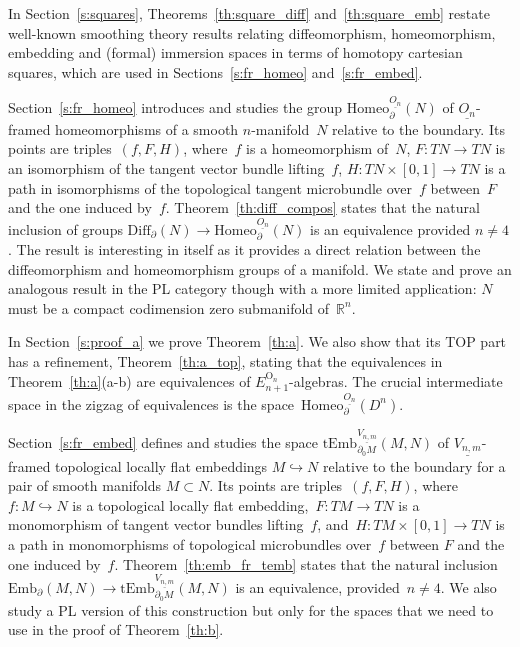 \documentclass[11pt]{amsart}
\theoremstyle{definition}
\newcommand{\R}{{\mathbb R}}
\newcommand{\Emb}{\mathrm{Emb}}
\newcommand{\tEmb}{\mathrm{tEmb}}
\newcommand{\Diff}{\mathrm{Diff}}
\newcommand{\Homeo}{\mathrm{Homeo}}
\newcommand{\OO}{\mathrm{O}}
\numberwithin{equation}{section}
\begin{document}
In Section~\ref{s:squares}, Theorems~\ref{th:square_diff} and~\ref{th:square_emb} restate well-known smoothing theory results relating diffeomorphism, homeomorphism, embedding and (formal) immersion spaces in terms of homotopy cartesian squares, which are used  in Sections~\ref{s:fr_homeo} and~\ref{s:fr_embed}. 

Section~\ref{s:fr_homeo} introduces and studies the group $\Homeo_\partial^{\underline{O_n}}(N)$ of $\underline{O_n}$-framed homeomorphisms of a smooth $n$-manifold~$N$ relative to the boundary.
Its points are triples~$(f,F,H)$, where~$f$ is a homeomorphism of~$N$, $F\colon TN\to TN$ is an isomorphism of the tangent vector bundle lifting~$f$, $H\colon TN\times [0,1]\to TN$ is a path in isomorphisms
of the topological tangent microbundle over~$f$  between~$F$ and the one induced by~$f$.  Theorem~\ref{th:diff_compos}    states that the natural inclusion of groups $\Diff_\partial(N)
\to \Homeo_\partial^{\underline{O_n}}(N)$ is an equivalence provided $n\neq 4$.   
 The result is interesting in itself as it provides a direct relation between the 
diffeomorphism and homeomorphism groups of a manifold. We state and prove an analogous result in the PL category though with a more limited application: $N$ must be a compact codimension zero
submanifold of~$\R^n$. 

In Section~\ref{s:proof_a} we prove Theorem~\ref{th:a}. We also show that its TOP part has a refinement, Theorem~\ref{th:a_top}, stating that the equivalences in Theorem~\ref{th:a}(a-b) are equivalences 
of  $E_{n+1}^{\OO_n}$-algebras. The crucial intermediate space in the zigzag of equivalences is the space~$\Homeo_\partial^{\underline{O_n}}(D^n)$.

Section~\ref{s:fr_embed} defines and studies the space $\tEmb_{\partial_0M}^{\underline{V_{n,m}}}(M,N)$ of $\underline{V_{n,m}}$-framed topological locally flat embeddings $M\hookrightarrow N$
relative to the boundary for a pair of smooth manifolds $M\subset N$. Its points are triples~$(f,F,H)$, where~$f\colon M\hookrightarrow N$ is a topological locally flat embedding,~$F\colon TM\to TN$ is a monomorphism of tangent vector bundles lifting~$f$,
and~$H\colon TM\times [0,1]\to TN$ is a path in monomorphisms of topological microbundles over~$f$ between $F$ and the one induced by~$f$.
Theorem~\ref{th:emb_fr_temb} states that the natural inclusion $\Emb_\partial(M,N)\to \tEmb_{\partial_0M}^{\underline{V_{n,m}}}(M,N)$ is an equivalence, provided~$n\neq 4$.
 We also study a PL version of this construction but only for the spaces that we need to use
in the proof of Theorem~\ref{th:b}.
\end{document}
